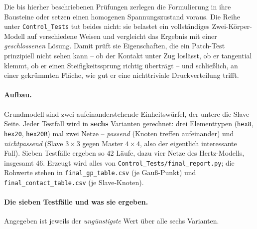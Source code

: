 \documentclass[a4paper,11pt]{article}
\newcommand{\code}[1]{\texttt{\small #1}}
\newcommand{\file}[1]{\texttt{\small #1}}
\begin{document}
Die bis hierher beschriebenen Prüfungen zerlegen die Formulierung in ihre Bausteine oder setzen
einen homogenen Spannungszustand voraus. Die Reihe unter \file{Control\_Tests} tut beides nicht:
sie belastet ein vollständiges Zwei-Körper-Modell auf verschiedene Weisen und vergleicht das
Ergebnis mit einer \emph{geschlossenen} Lösung. Damit prüft sie Eigenschaften, die ein Patch-Test
prinzipiell nicht sehen kann -- ob der Kontakt unter Zug loslässt, ob er tangential klemmt, ob er
einen Steifigkeitssprung richtig überträgt -- und schließlich, an einer gekrümmten Fläche, wie gut
er eine nichttriviale Druckverteilung trifft.

\paragraph{Aufbau.} Grundmodell sind zwei aufeinanderstehende Einheitswürfel, der untere die
Slave-Seite. Jeder Testfall wird in \textbf{sechs} Varianten gerechnet: drei Elementtypen
(\code{hex8}, \code{hex20}, \code{hex20R}) mal zwei Netze -- \emph{passend} (Knoten treffen
aufeinander) und \emph{nichtpassend} (Slave $3\times3$ gegen Master $4\times4$, also der eigentlich
interessante Fall). Sieben Testfälle ergeben so $42$ Läufe, dazu vier Netze des Hertz-Modells,
insgesamt $46$. Erzeugt wird alles von \file{Control\_Tests/final\_report.py}; die Rohwerte stehen
in \file{final\_gp\_table.csv} (je Gauß-Punkt) und \file{final\_contact\_table.csv} (je
Slave-Knoten).

\paragraph{Die sieben Testfälle und was sie ergeben.}
Angegeben ist jeweils der \emph{ungünstigste} Wert über alle sechs Varianten.
\end{document}

